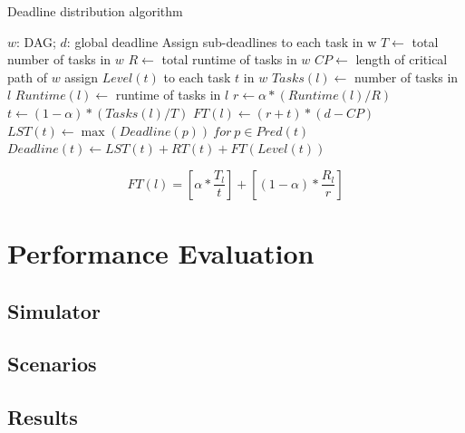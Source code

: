 \documentclass{sig-alternate}
\begin{document}
\begin{algorithm}
\caption{Deadline distribution algorithm}
\label{alg:deadlinedistribution}
\begin{algorithmic}[1]
\Require $w$: DAG; $d$: global deadline
\Ensure Assign sub-deadlines to each task in w
    \State $T \gets$ total number of tasks in $w$
    \State $R \gets$ total runtime of tasks in $w$
    \State $CP \gets$ length of critical path of $w$
    \State assign $Level(t)$ to each task $t$ in $w$
        \State $Tasks(l) \gets$ number of tasks in $l$
        \State $Runtime(l) \gets$ runtime of tasks in $l$
        \State $r \gets \alpha * (Runtime(l)/R)$
        \State $t \gets (1-\alpha) * (Tasks(l)/T)$
        \State $FT(l) \gets (r + t) * (d - CP)$
    \EndFor
        \State $LST(t) \gets \max(Deadline(p))\ for\ p \in Pred(t)$
        \State $Deadline(t) \gets LST(t) + RT(t) + FT(Level(t))$
    \EndFor
\EndProcedure
\end{algorithmic} 
\end{algorithm}

\begin{equation}
\label{eq:scaling}
FT(l) = \left[{\alpha}*\frac{T_l}{t}\right] + \left[{(1 - \alpha)}*\frac{R_l}{r} \right]
\end{equation}

\section{Performance Evaluation}

\subsection{Simulator}

\subsection{Scenarios}

\subsection{Results}
\end{document}
